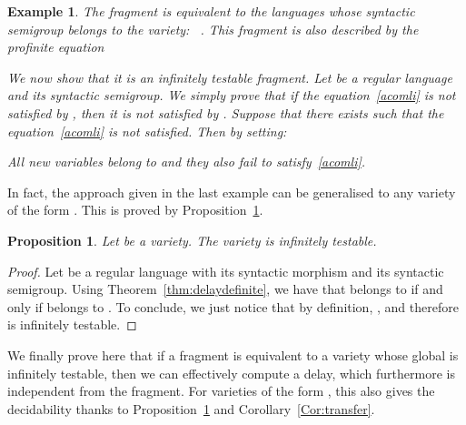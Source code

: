 \documentclass[submission,hidelink]{dmtcs-episciences}
\newtheorem{proposition}[theorem]{Proposition}
\newtheorem{example}{Example}
\begin{document}
\begin{example}\label{Prop:FO1-InfTest}
	The fragment  is equivalent to the languages whose syntactic semigroup belongs to
	the variety: ~\citep[Theorem VI.3.1]{Straubing94}.
	This fragment is also described by the profinite equation
	
	We now show that it is an infinitely testable fragment.
	Let  be a regular language and  its syntactic semigroup.
	We simply prove that if the equation~\eqref{acomli} is not satisfied by , then it is not satisfied by
	.
	Suppose that there exists  such that the  equation~\eqref{acomli} is not satisfied.
	Then by setting:
		
	All new variables belong to  and they also fail to satisfy~\eqref{acomli}.
\end{example}

	In fact, the approach given in the last example can be generalised to any variety of the form .
	This is proved by Proposition~\ref{Prop:VD}.



\begin{proposition}\label{Prop:VD}
	 Let  be a variety.
		The variety  is infinitely testable.
\end{proposition}
	\begin{proof}
		Let  be a regular language with  its syntactic morphism and 
		its syntactic semigroup.
		Using Theorem~\ref{thm:delaydefinite}, we have that  belongs to  if and only if
		 belongs to . To conclude, we just notice that by definition, , and therefore
		 is infinitely testable.
	\end{proof}











We finally prove here that if a fragment is equivalent to a variety whose global is infinitely testable, then we can effectively compute a delay, which furthermore is independent from the fragment.
For varieties of the form , this also gives the decidability thanks to Proposition~\ref{Prop:VD} and
Corollary~\ref{Cor:transfer}.
\end{document}
